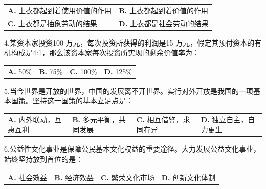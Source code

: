 \documentclass[UTF8,11pt]{ctexart}
\begin{document}
\begin{center}\begin{tabular}{>{\raggedright\arraybackslash}p{\dimexpr(\linewidth-4\tabcolsep)/2\relax}>{\raggedright\arraybackslash}p{\dimexpr(\linewidth-4\tabcolsep)/2\relax}}
\textbf{A.} 上衣都起到着使用价值的作用 & \textbf{B.} 上衣都起到着价值的作用\\[.35em]
\textbf{C.} 上衣都是抽象劳动的结果 & \textbf{D.} 上衣都是社会劳动的结果\\[.35em]\end{tabular}\end{center}

4.某资本家投资100 万元，每次投资所获得的利润是15 万元，假定其预付资本的有机构成是4:1，那么该资本家每次投资所实现的剩余价值率为：


\begin{center}\begin{tabular}{>{\raggedright\arraybackslash}p{\dimexpr(\linewidth-8\tabcolsep)/4\relax}>{\raggedright\arraybackslash}p{\dimexpr(\linewidth-8\tabcolsep)/4\relax}>{\raggedright\arraybackslash}p{\dimexpr(\linewidth-8\tabcolsep)/4\relax}>{\raggedright\arraybackslash}p{\dimexpr(\linewidth-8\tabcolsep)/4\relax}}
\textbf{A.} 50\% & \textbf{B.} 75\% & \textbf{C.} 100\% & \textbf{D.} 125\%\\[.35em]\end{tabular}\end{center}

5.当今世界是开放的世界，中国的发展离不开世界。实行对外开放是我国的一项基本国策。坚持这一国策的基本立足点是：


\begin{center}\begin{tabular}{>{\raggedright\arraybackslash}p{\dimexpr(\linewidth-8\tabcolsep)/4\relax}>{\raggedright\arraybackslash}p{\dimexpr(\linewidth-8\tabcolsep)/4\relax}>{\raggedright\arraybackslash}p{\dimexpr(\linewidth-8\tabcolsep)/4\relax}>{\raggedright\arraybackslash}p{\dimexpr(\linewidth-8\tabcolsep)/4\relax}}
\textbf{A.} 内外联动，互惠互利 & \textbf{B.} 多元平衡，共同发展 & \textbf{C.} 相互借鉴，求同存异 & \textbf{D.} 独立自主，自力更生\\[.35em]\end{tabular}\end{center}

6.公益性文化事业是保障公民基本文化权益的重要途径。大力发展公益文化事业，始终坚持放到首位的是：


\begin{center}\begin{tabular}{>{\raggedright\arraybackslash}p{\dimexpr(\linewidth-8\tabcolsep)/4\relax}>{\raggedright\arraybackslash}p{\dimexpr(\linewidth-8\tabcolsep)/4\relax}>{\raggedright\arraybackslash}p{\dimexpr(\linewidth-8\tabcolsep)/4\relax}>{\raggedright\arraybackslash}p{\dimexpr(\linewidth-8\tabcolsep)/4\relax}}
\textbf{A.} 社会效益 & \textbf{B.} 经济效益 & \textbf{C.} 繁荣文化市场 & \textbf{D.} 创新文化体制\\[.35em]\end{tabular}\end{center}
\end{document}
